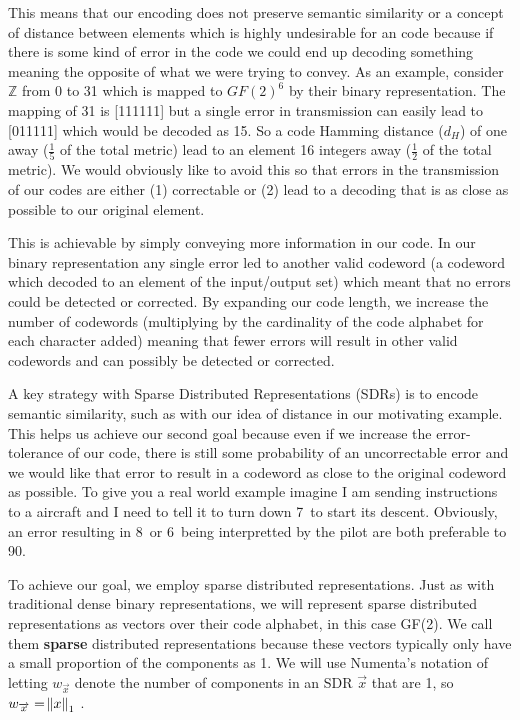\documentclass[oneside,12pt,openany]{book}
\begin{document}
	This means that our encoding does not preserve semantic similarity or a concept of distance between elements which is highly undesirable for an code because if there is some kind of error in the code we could end up decoding something meaning the opposite of what we were trying to convey. As an example, consider $\mathbb{Z}$ from 0 to 31 which is mapped to $GF(2)^{6}$ by their binary representation. The mapping of 31 is [111111] but a single error in transmission can easily lead to [011111] which would be decoded as 15. So a code Hamming distance ($d_{H}$) of one away ($\frac{1}{5}$ of the total metric) lead to an element 16 integers away ($\frac{1}{2}$ of the total metric). We would obviously like to avoid this so that errors in the transmission of our codes are either (1) correctable or (2) lead to a decoding that is as close as possible to our original element.
	
	This is achievable by simply conveying more information in our code. In our binary representation any single error led to another valid codeword (a codeword which decoded to an element of the input/output set) which meant that no errors could be detected or corrected. By expanding our code length, we increase the number of codewords (multiplying by the cardinality of the code alphabet for each character added) meaning that fewer errors will result in other valid codewords and can possibly be detected or corrected. 
	
	A key strategy with Sparse Distributed Representations (SDRs) is to encode semantic similarity, such as with our idea of distance in our motivating example. This helps us achieve our second goal because even if we increase the error-tolerance of our code, there is still some probability of an uncorrectable error and we would like that error to result in a codeword as close to the original codeword as possible. To give you a real world example imagine I am sending instructions to a aircraft and I need to tell it to turn down 7\textdegree~to start its descent. Obviously, an error resulting in 8\textdegree~or 6\textdegree~being interpretted by the pilot are both preferable to 90\textdegree.
	
	To achieve our goal, we employ sparse distributed representations. Just as with traditional dense binary representations, we will represent sparse distributed representations as vectors over their code alphabet, in this case GF(2). We call them \textbf{sparse} distributed representations because these vectors typically only have a small proportion of the components as 1. We will use Numenta's notation of letting $w_{\overrightarrow{x}}$ denote the number of components in an SDR $\overrightarrow{x}$ that are 1, so $w_{\overrightarrow{x}} = \norm{x}_{1}$ \cite{Properties}.
	
\end{document}

